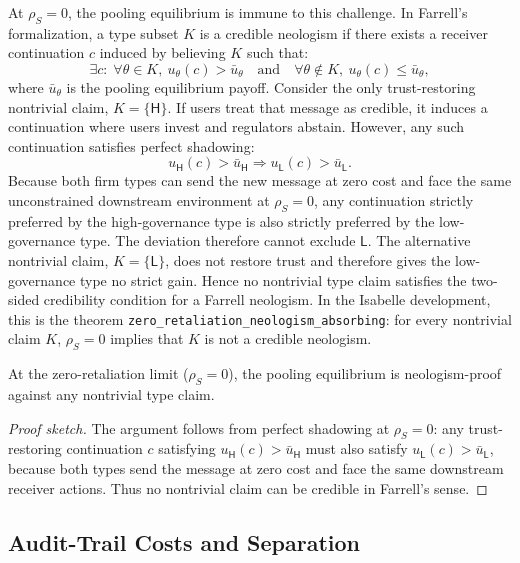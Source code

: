 At $\rho_S=0$, the pooling equilibrium is immune to this challenge. In Farrell's
formalization, a type subset $K$ is a credible neologism if there exists a receiver
continuation $c$ induced by believing $K$ such that:
\[
\exists c:\; \forall\theta\in K,\ u_\theta(c)>\bar u_\theta
\quad\text{and}\quad
\forall\theta\notin K,\ u_\theta(c)\le \bar u_\theta ,
\]
where $\bar u_\theta$ is the pooling equilibrium payoff. Consider the only trust-restoring
nontrivial claim, $K=\{\mathsf{H}\}$. If users treat that message as credible,
it induces a continuation where users invest and regulators abstain. However, any
such continuation satisfies perfect shadowing:
\[
u_\mathsf{H}(c)>\bar u_\mathsf{H} \Rightarrow u_\mathsf{L}(c)>\bar u_\mathsf{L} .
\]
Because both firm types can send the new message at zero cost and face the same
unconstrained downstream environment at $\rho_S=0$, any continuation strictly
preferred by the high-governance type is also strictly preferred by the
low-governance type. The deviation therefore cannot exclude $\mathsf{L}$. The alternative nontrivial
claim, $K=\{\mathsf{L}\}$, does not restore trust and therefore gives the
low-governance type no strict gain. Hence no nontrivial type claim satisfies the
two-sided credibility condition for a Farrell neologism. In the Isabelle
development, this is the theorem
\texttt{zero\_\allowbreak{}retaliation\_\allowbreak{}neologism\_\allowbreak{}absorbing}:
for every nontrivial claim $K$, $\rho_S=0$ implies that $K$ is not a credible
neologism.

\begin{theorem}
\label{thm:neologism-proof}
At the zero-retaliation limit ($\rho_S=0$), the pooling equilibrium is neologism-proof
against any nontrivial type claim.
\end{theorem}

\begin{proof}[Proof sketch]
The argument follows from perfect shadowing at $\rho_S=0$: any trust-restoring continuation $c$ satisfying
$u_\mathsf{H}(c)>\bar u_\mathsf{H}$ must also satisfy $u_\mathsf{L}(c)>\bar u_\mathsf{L}$,
because both types send the message at zero cost and face the same downstream receiver actions.
Thus no nontrivial claim can be credible in
Farrell's sense.
\end{proof}

\subsection{Audit-Trail Costs and Separation}
\label{subsec:audit-trail-separation}

